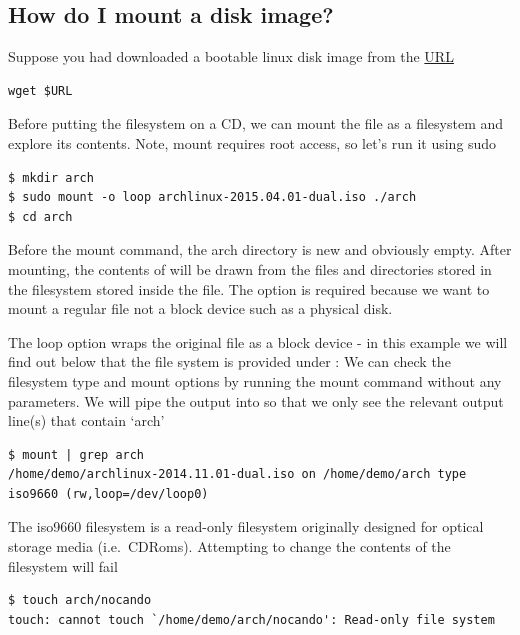 \subsection{How do I mount a disk image?}\label{how-do-i-mount-a-disk-image}

Suppose you had downloaded a bootable linux disk image from the \href{http://cosmos.cites.illinois.edu/pub/archlinux/iso/2015.04.01/archlinux-2015.04.01-dual.iso}{URL}

\begin{lstlisting}
wget $URL
\end{lstlisting}

Before putting the filesystem on a CD, we can mount the file as a filesystem and explore its contents. Note, mount requires root access, so let's run it using sudo

\begin{lstlisting}
$ mkdir arch
$ sudo mount -o loop archlinux-2015.04.01-dual.iso ./arch
$ cd arch
\end{lstlisting}

Before the mount command, the arch directory is new and obviously empty. After mounting, the contents of  will be drawn from the files and directories stored in the filesystem stored inside the  file. The  option is required because we want to mount a regular file not a block device such as a physical disk.

The loop option wraps the original file as a block device - in this example we will find out below that the file system is provided under  : We can check the filesystem type and mount options by running the mount command without any parameters. We will pipe the output into  so that we only see the relevant output line(s) that contain `arch'

\begin{lstlisting}
$ mount | grep arch
/home/demo/archlinux-2014.11.01-dual.iso on /home/demo/arch type iso9660 (rw,loop=/dev/loop0)
\end{lstlisting}

The iso9660 filesystem is a read-only filesystem originally designed for optical storage media (i.e.~CDRoms). Attempting to change the contents of the filesystem will fail

\begin{lstlisting}
$ touch arch/nocando
touch: cannot touch `/home/demo/arch/nocando': Read-only file system
\end{lstlisting}


